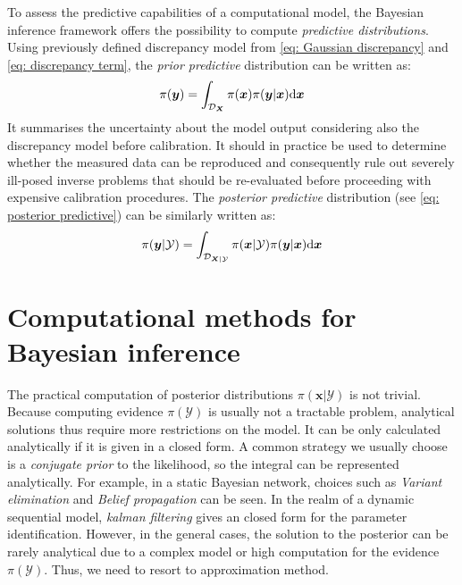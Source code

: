 To assess the predictive capabilities of a computational model, the Bayesian inference framework offers the possibility to compute \textit{predictive distributions}. Using previously defined discrepancy model from \cref{eq: Gaussian discrepancy} and \cref{eq: discrepancy term}, the \textit{prior predictive} distribution can be written as:
\begin{equation}
    \label{eq: prior predictive}
    \pi(\boldsymbol{y}) = \int_{\mathcal{D}_{\boldsymbol{X}}} 
    \pi(\boldsymbol{x}) \pi(\boldsymbol{y}|\boldsymbol{x}) {\rm{d}} \boldsymbol{x}
\end{equation}
It summarises the uncertainty about the model output considering also the discrepancy model before calibration. It should in practice be used to determine whether the measured data can be reproduced and consequently rule out severely ill-posed inverse problems that should be re-evaluated before proceeding with expensive calibration procedures. The \textit{posterior predictive} distribution (see \cref{eq: posterior predictive}) can be similarly written as:
\begin{equation}
    \label{eq: posterior predictive}
    \pi(\boldsymbol{y}|\mathcal{Y}) = \int_{\mathcal{D}_{\boldsymbol{X}|\mathcal{Y}}} 
    \pi(\boldsymbol{x}|\mathcal{Y}) \pi(\boldsymbol{y}|\boldsymbol{x}) {\rm{d}} \boldsymbol{x}
\end{equation}
\section{Computational methods for Bayesian inference}
\label{section: Computational methods}
The practical computation of posterior distributions $\pi(\boldsymbol{x}|\mathcal{Y})$ is not trivial. Because computing evidence $\pi(\mathcal{Y})$ is usually not a tractable problem, analytical solutions thus require more restrictions on the model. It can be only calculated analytically if it is given in a closed form. A common strategy we usually choose is a \textit{conjugate prior} \citep{gelman1995} to the likelihood, so the integral can be represented analytically. For example, in a static Bayesian network, choices such as \textit{Variant elimination} and \textit{Belief propagation} \citep{murphy2012} can be seen. In the realm of a dynamic sequential model, \textit{kalman filtering} \citep{nguyen2016} gives an closed form for the parameter identification. However, in the general cases, the solution to the posterior can be rarely analytical due to a complex model or high computation for the evidence $\pi(\mathcal{Y})$. Thus, we need to resort to approximation method.

